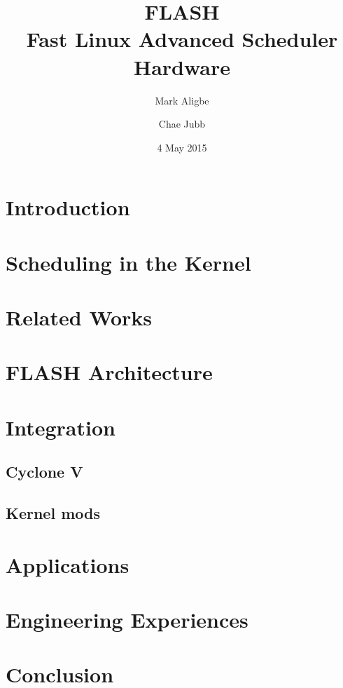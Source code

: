 \documentclass{sig-alternate-10pt}
\title{FLASH\\Fast Linux Advanced Scheduler Hardware}
\author{
	Mark Aligbe \\
	    \email{ma2799@columbia.edu}
	\and
    Chae Jubb \\
        \email{ecj2122@columbia.edu}
}
\date{4 May 2015}
\begin{document}
\maketitle

\begin{abstract}
\lipsum[1]

\end{abstract}


\section{Introduction}
\lipsum[1-3]


\section{Scheduling in the Kernel}
\lipsum[1-3]


\section{Related Works}
\lipsum[1-2]


\section{FLASH Architecture}
\lipsum[1-8]


\section{Integration}
\subsection{Cyclone V}
\lipsum[1-3]


\subsection{Kernel mods}
\lipsum[1-3]


\section{Applications}
\lipsum[1-3]


\section{Engineering Experiences}
\lipsum[1-3]


\section{Conclusion}
\lipsum[1]

\nocite{*}
{
	
	
}
\end{document}
